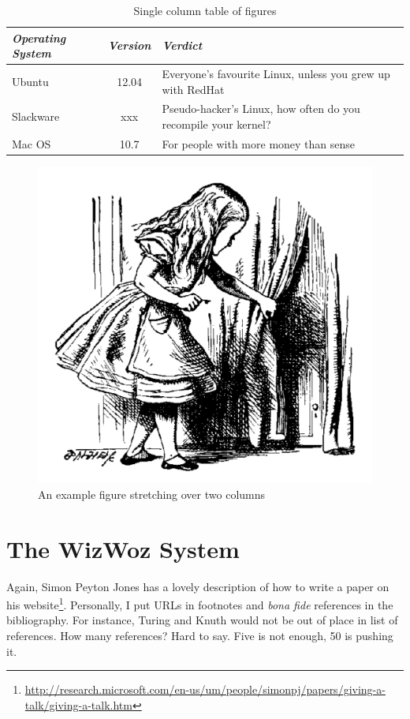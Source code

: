 \documentclass{mpaper}
\begin{document}
\begin{table}
\begin{tabular}{l||c||p{2cm}}
\emph{Operating System} & \emph{Version} & \emph{Verdict} \\ \hline \hline
Ubuntu & 12.04 & Everyone's favourite Linux, unless you grew up with
RedHat \\ \hline
Slackware & xxx & Pseudo-hacker's Linux, how often do you recompile
your kernel? \\ \hline
Mac OS & 10.7 & For people with more money than sense \\ \hline
\end{tabular}
\caption{\label{tab-eg}Single column table of figures}
\end{table}

\begin{figure}
\begin{center}
\includegraphics[scale=0.3]{images/alice.pdf}
\end{center}
\caption{\label{fig-eg}An example figure stretching over two columns}
\end{figure}

\section{The WizWoz System}

Again, Simon Peyton Jones has a lovely description of how to write a
paper on his
website\footnote{\url{http://research.microsoft.com/en-us/um/people/simonpj/papers/giving-a-talk/giving-a-talk.htm}}.
Personally, I put URLs in footnotes and \emph{bona fide} references
in the bibliography. For instance, Turing \cite{turing37computable}
and Knuth \cite{knuth68art} would not be out of place in list of
references.
How many references? Hard to say. Five is not enough, 50 is pushing
it.
\end{document}
